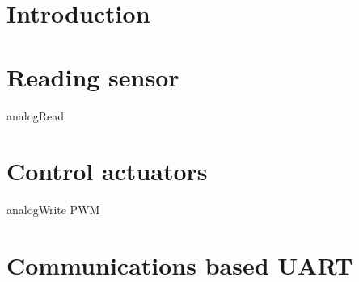 \section{Introduction}
\section{Reading sensor}
analogRead
\section{Control actuators}
analogWrite PWM
\section{Communications based UART}
